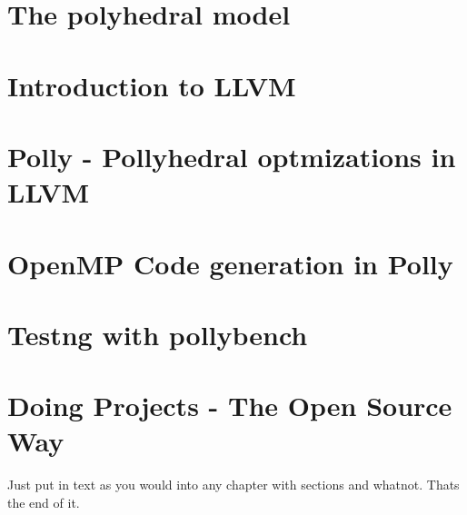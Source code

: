 \documentclass[MTech]{iitmdiss}
\begin{document}
 \chapter{The polyhedral model}


 \chapter{Introduction to LLVM}


\chapter{Polly - Pollyhedral optmizations in LLVM}


\chapter{OpenMP Code generation in Polly}


\chapter{Testng with pollybench}


%




\appendix
 
\chapter{Doing Projects - The Open Source Way}
 
 Just put in text as you would into any chapter with sections and
 whatnot.  Thats the end of it.

\end{document}
